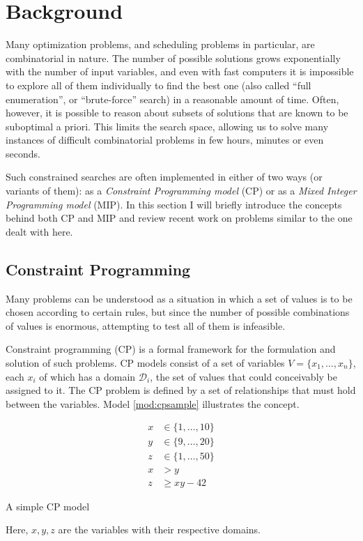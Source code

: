 \documentclass[13pt, letterpaper, oneside]{book}
\begin{document}
\chapter{Background}
Many optimization problems, and scheduling problems in particular, are
combinatorial in nature. The number of possible solutions grows exponentially
with the number of input variables, and even with fast computers it is
impossible to explore all of them individually to find the best one
(also called ``full enumeration'', or ``brute-force'' search) in a reasonable
amount of time. Often, however, it is possible to reason about subsets of
solutions that are known to be suboptimal a priori. This limits the search
space, allowing us to solve many instances of difficult combinatorial problems
in few hours, minutes or even seconds.

Such constrained searches are often implemented in either of two ways (or
variants of them): as a \textit{Constraint Programming model} (CP) or as a
\textit{Mixed Integer Programming model} (MIP). In this section I will briefly
introduce the concepts behind both CP and MIP and review recent work on problems
similar to the one dealt with here.

\section{Constraint Programming}

Many problems can be understood as a situation in which a set of values is to be
chosen according to certain rules, but since the number of possible combinations
of values is enormous, attempting to test all of them is infeasible.


Constraint programming (CP) is a formal framework for the formulation and
solution of such problems. CP models consist of a set of variables $V = \{x_1,
\dots, x_n\}$, each $x_i$ of which has a domain $\mathcal{D}_i$, the set of
values that could conceivably be assigned to it. The CP problem is defined by a
set of relationships that must hold between the variables. Model
\ref{mod:cpsample} illustrates the concept.

\begin{model}
\begin{align}
x &\in \{1,\dots,10\}\\
y &\in \{9,\dots,20\}\\
z &\in \{1,\dots,50\}\\
x &> y\\
z &\geq xy - 42
\end{align}
\caption{A simple CP model}
\label{mod:cpsample}
\end{model}
Here, $x, y, z$ are the variables with their respective domains.
\end{document}
